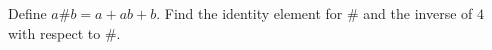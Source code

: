 Define $a\#b=a+ab+b$. Find the identity element for $\#$ and the inverse of $4$ with respect to $\#$.
